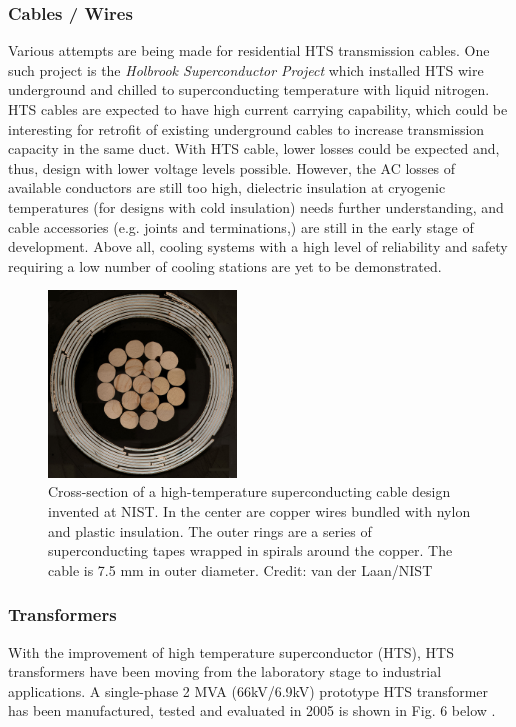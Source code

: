\documentclass{article}
\begin{document}
	\subsubsection{Cables / Wires}
	Various attempts are being made for residential HTS transmission cables. One such project is the \textit{Holbrook Superconductor Project} \cite{wikiCable} which installed HTS wire underground and chilled to superconducting temperature with liquid nitrogen.
	HTS cables are expected to have high current carrying
	capability, which could be interesting for retrofit of
	existing underground cables to increase transmission
	capacity in the same duct. With HTS cable, lower losses
	could be expected and, thus, design with lower voltage
	levels possible. However, the AC losses of available
	conductors are still too high, dielectric insulation at
	cryogenic temperatures (for designs with cold insulation) needs further understanding, and cable accessories
	(e.g. joints and terminations,) are still in the early stage of development. Above all, cooling systems with a high
	level of reliability and safety requiring a low number of
	cooling stations are yet to be demonstrated.
	
	\begin{figure}[h]
		\centering
		\includegraphics[width=5cm]{high_temperature_superconducting_cables.jpg}
		\caption{Cross-section of a high-temperature superconducting cable design invented at NIST. In the center are copper wires bundled with nylon and plastic insulation. The outer rings are a series of superconducting tapes wrapped in spirals around the copper. The cable is 7.5 mm in outer diameter. Credit: van der Laan/NIST }
		
	\end{figure} 
	
 \subsubsection{Transformers}
	
	With the improvement of high temperature superconductor (HTS), HTS transformers have been moving from the laboratory stage to industrial applications. A single-phase 2 MVA (66kV/6.9kV) prototype HTS transformer has been manufactured, tested and evaluated in 2005 is shown in Fig. 6 below \cite{hts2mva}.
	
\end{document}
